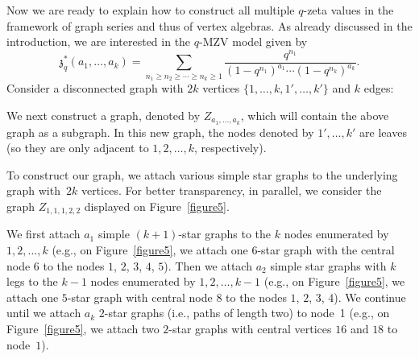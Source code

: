 \documentclass[10pt,a4paper]{amsart}
\numberwithin{equation}{section}
\theoremstyle{definition}
\begin{document}
Now we are ready to explain how to construct all multiple $q$-zeta values in the framework of graph series and thus of vertex algebras. As already discussed in the introduction, we
are interested
in the $q$-MZV model given by
\[
{\mathfrak{z}}_q^*(a_1,\dots,a_k)=\sum_{n_1 \geq n_2 \geq \cdots \geq n_k \geq 1} \frac{q^{n_1}}{(1-q^{n_1})^{a_1} \cdots (1-q^{n_k})^{a_k}}.
\]
Consider a disconnected graph with $2k$ vertices $\{1,\dots,k,1',\dots,k' \}$ and $k$ edges:
\begin{center}
\end{center}
We next construct a graph, denoted by $Z_{a_1,\dots,a_k}$, which will contain the above graph as a subgraph. In this new graph, the nodes denoted by $1',\dots,k'$ are leaves (so they are only adjacent to $1,2,\dots,k$, respectively).

To construct our graph, we attach various simple star graphs to the underlying graph with~$2k$ vertices. For better transparency, in parallel, we consider the graph
$Z_{1,1,1,2,2}$ displayed on Figure~\ref{figure5}.

We first attach $a_1$ simple $(k+1)$-star graphs to the $k$ nodes enumerated by $1,2,\dots,k$ (e.g., on Figure~\ref{figure5}, we attach one $6$-star graph with the central node $6$ to the nodes $1$, $2$, $3$, $4$, $5$).
Then we attach $a_2$ simple star graphs with $k$ legs to the $k-1$ nodes enumerated by $1,2,\dots,k-1$ (e.g., on Figure~\ref{figure5}, we attach one $5$-star graph with central node $8$ to the nodes $1$, $2$, $3$, $4$). We continue until we attach $a_k$ $2$-star graphs (i.e., paths of length two) to node~1 (e.g., on Figure~\ref{figure5}, we attach two $2$-star graphs with central vertices $16$ and $18$ to node~$1$).
\end{document}
